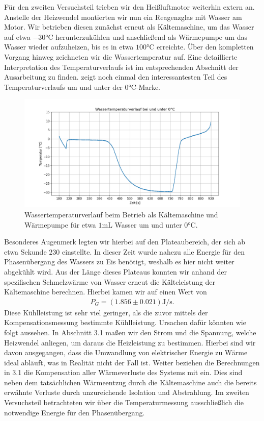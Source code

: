 Für den zweiten Versuchsteil trieben wir den Heißluftmotor weiterhin extern an. Anstelle der Heizwendel montierten wir nun ein Reagenzglas mit Wasser am Motor. Wir betrieben diesen zunächst erneut als Kältemaschine, um das Wasser auf etwa $-30\si{\celsius}$ herunterzukühlen und anschließend als Wärmepumpe um das Wasser wieder aufzuheizen, bis es in etwa $100\si{\celsius}$ erreichte. Über den kompletten Vorgang hinweg zeichneten wir die Wassertemperatur auf. Eine detaillierte Interpretation des Temperaturverlaufs ist im entsprechenden Abschnitt der Ausarbeitung zu finden.  zeigt noch einmal den interessantesten Teil des Temperaturverlaufs um und unter der $0\si{\celsius}$-Marke.

\begin{figure}[H]
  \centering
  \includegraphics[width=.9\textwidth]{files/tempverlauf_unter0.png}
  \caption{Wassertemperaturverlauf beim Betrieb als Kältemaschine und Wärmepumpe für etwa $1 \si{\milli\liter}$ Wasser um und unter $0\si{\celsius}$.}
  \label{fig:tempverlauf_unter0}
\end{figure}

Besonderes Augenmerk legten wir hierbei auf den Plateaubereich, der sich ab etwa Sekunde $230$ einstellte. In dieser Zeit wurde nahezu alle Energie für den Phasenübergang des Wassers zu Eis benötigt, weshalb es hier nicht weiter abgekühlt wird. Aus der Länge dieses Plateaus konnten wir anhand der spezifischen Schmelzwärme von Wasser erneut die Kälteleistung der Kältemaschine berechnen. Hierbei kamen wir auf einen Wert von
\begin{align*}
  P_G = (1.856 \pm 0.021)\si{\joule\per\second}.
\end{align*}
Diese Kühlleistung ist sehr viel geringer, als die zuvor mittels der Kompensationsmessung bestimmte Kühlleistung. Ursachen dafür könnten wie folgt aussehen. In Abschnitt 3.1 maßen wir den Strom und die Spannung, welche Heizwendel anliegen, um daraus die Heizleistung zu bestimmen. Hierbei sind wir davon ausgegangen, dass die Umwandlung von elektrischer Energie zu Wärme ideal abläuft, was in Realität nicht der Fall ist. Weiter beziehen die Berechnungen in 3.1 die Kompensation aller Wärmeverluste des Systems mit ein. Dies sind neben dem tatsächlichen Wärmeentzug durch die Kältemaschine auch die bereits erwähnte Verluste durch unzureichende Isolation und Abstrahlung. Im zweiten Versuchsteil betrachteten wir über die Temperaturmessung ausschließlich die notwendige Energie für den Phasenübergang.


